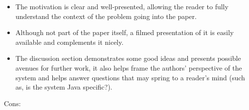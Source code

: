 \documentclass[11pt]{article}
\begin{document}
\begin{itemize}


    \item The motivation is clear and well-presented, allowing the reader to
    fully understand the context of the problem going into the paper.

    \item Although not part of the paper itself, a filmed presentation of it is
    easily available and complements it nicely.

    \item The discussion section demonstrates some good ideas and presents
    possible avenues for further work, it also helps frame the authors'
    perspective of the system and helps answer questions that may spring to a
    reader's mind (such as, is the system Java specific?).

\end{itemize}

Cons:
\end{document}
